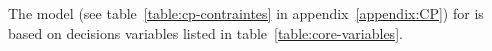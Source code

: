 The \CP{} model (see table~\ref{table:cp-contraintes} in appendix~\ref{appendix:CP}) for {\UTP} is based on decisions variables listed in table~\ref{table:core-variables}.
%
